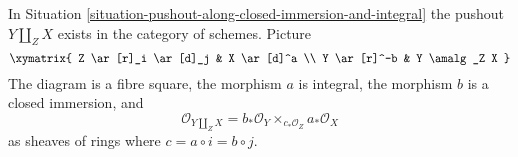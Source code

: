 \begin{proposition}
\label{proposition-pushout-along-closed-immersion-and-integral}
\begin{reference}
\cite[Theorem 7.1 part iii]{Ferrand-Conducteur}
\end{reference}
In Situation \ref{situation-pushout-along-closed-immersion-and-integral}
the pushout $Y \amalg_Z X$ exists in the category of schemes. Picture
$$
\xymatrix{
Z \ar[r]_i \ar[d]_j & X \ar[d]^a \\
Y \ar[r]^-b & Y \amalg_Z X
}
$$
The diagram is a fibre square, the morphism $a$ is integral,
the morphism $b$ is a closed immersion, and
$$
\mathcal{O}_{Y \amalg_Z X} =
b_*\mathcal{O}_Y \times_{c_*\mathcal{O}_Z} a_*\mathcal{O}_X
$$
as sheaves of rings where $c = a \circ i = b \circ j$.
\end{proposition}

